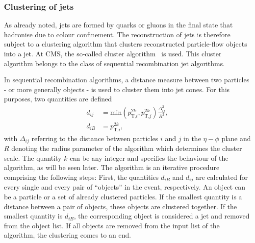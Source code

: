 \subsubsection*{Clustering of jets}
As already noted, jets are formed by quarks or gluons in the final state that hadronise due to colour confinement. 
The reconstruction of jets is therefore subject to a clustering algorithm that clusters reconstructed particle-flow objects into a jet.
At CMS, the so-called \antikt cluster algorithm~\cite{bib:JetClustering_2008} is used.
This cluster algorithm belongs to the class of sequential recombination jet algorithms.

In sequential recombination algorithms, a distance measure between two particles - or more generally objects - is used to cluster them into jet cones.
For this purposes, two quantities are defined
\begin{equation}
\begin{aligned}
\label{eq:Antikt}
d_{ij} &= \text{min}\left( p_{\text{T,}i}^{2k},p_{\text{T,}j}^{2k} \right) \frac{\Delta_{ij}^2}{R^2},\\
d_{iB} &= p_{\text{T,}i}^{2k},
\end{aligned} 
\end{equation}
with $\Delta_{ij}$ referring to the distance between particles $i$ and $j$ in the $\eta - \phi$ plane and $R$ denoting the radius parameter of the algorithm which determines the cluster scale.
The quantity $k$ can be any integer and specifies the behaviour of the algorithm, as will be seen later.
The algorithm is an iterative procedure comprising the following steps: 
First, the quantities $d_{iB}$ and $d_{ij}$ are calculated for every single and every pair of ``objects'' in the event, respectively.
An object can be a particle or a set of already clustered particles.
If the smallest quantity is a distance between a pair of objects, these objects are clustered together.
If the smallest quantity is $d_{iB}$, the corresponding object is considered a jet and removed from the object list.
If all objects are removed from the input list of the algorithm, the clustering comes to an end.

